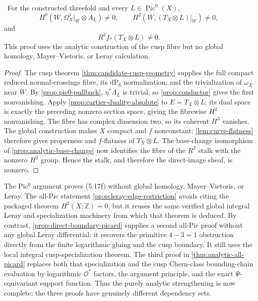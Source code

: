 \begin{corollary}
\label{cor:candidate-pic0-route}
\Verified\ For the constructed threefold and every
$L\in\operatorname{Pic}^0(X)$,
\[
 H^0(W,\Omega_X^1|_W\otimes A_L)\ne0,
 \qquad
 H^2(W,(T_X\otimes L)|_W)\ne0,
\]
and
\[
 R^2f_*(T_X\otimes L)\ne0.
\tag{5.17f}
\]
This proof uses the analytic construction of the cusp fibre but no global
homology, Mayer--Vietoris, or Leray calculation.
\end{corollary}

\begin{proof}
The cusp theorem \cref{thm:candidate-cusp-geometry} supplies the full compact
reduced normal-crossings fibre, its $\mathrm{dP}_6$ normalization, and the
trivialization of $\omega_X$ near $W$.  By
\cref{prop:pic0-pullback}, $\eta^*A_L$ is trivial, so
\cref{prop:conductor} gives the first nonvanishing.  Apply
\cref{prop:cartier-duality-absolute} to $E=T_X\otimes L$; its dual space is
exactly the preceding nonzero section space, giving the fibrewise $H^2$
nonvanishing.  The fibre has complex dimension two, so its coherent
$H^3$ vanishes.  The global construction makes $X$ compact and $f$
nonconstant; \cref{lem:curve-flatness} therefore gives properness and
$f$-flatness of $T_X\otimes L$.  The base-change isomorphism of
\cref{prop:analytic-base-change} now identifies the fibre of the $R^2$
stalk with the nonzero $H^2$ group.  Hence the stalk, and therefore the
direct-image sheaf, is nonzero.
\end{proof}

\begin{remark}
The Pic$^0$ argument proves (5.17f) without global homology,
Mayer--Vietoris, or Leray.  The all-Pic statement
\cref{prop:leray-edge-restriction} avoids citing the packaged theorem
$H^2(X;\mathbb Z)=0$, but it reuses the same verified global integral
Leray and specialization machinery from which that theorem is deduced.
By contrast, \cref{prop:direct-boundary-picard} supplies a second all-Pic
proof without any global Leray differential: it recovers the primitive
$4-3=1$ obstruction directly from the finite logarithmic gluing and the
cusp boundary.  It still uses the local integral cusp-specialization
theorem.  The third proof in \cref{thm:analytic-all-picard} replaces both
that specialization and the cusp Chern-class bounding-chain evaluation by
logarithmic $\mathcal O^*$ factors, the argument principle, and the exact
$\Psi$-equivariant support function.  Thus the purely analytic
strengthening is now complete; the three proofs have genuinely different
dependency sets.
\end{remark}


